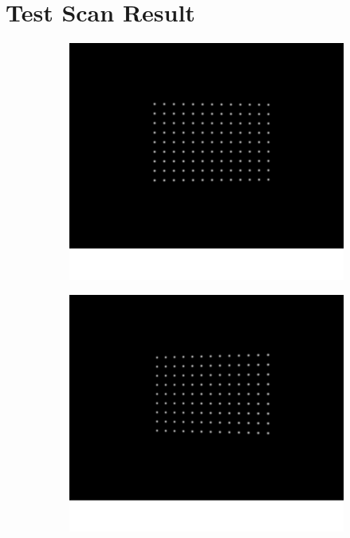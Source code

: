 \chapter{Test Scan Result}\label{fig:all_test_scan}
\begin{figure}[h!]
	\centering
	\begin{subfigure}[t]{0.3\linewidth}
		\centering
		\includegraphics[width=0.8\linewidth]{figures/part2/test_left_1}
	\end{subfigure}
	\begin{subfigure}[t]{0.3\linewidth}
		\centering
		\includegraphics[width=0.8\linewidth]{figures/part2/test_right_1}
	\end{subfigure}
	\begin{subfigure}[t]{0.35\linewidth}
		\centering

\end{subfigure}
\end{figure}
